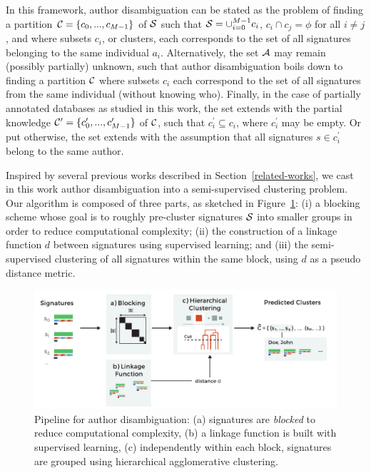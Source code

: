 \documentclass[conference]{IEEEtran}
\begin{document}
In this
framework, author disambiguation can be stated as the problem of
finding a partition ${\cal C} = \{ c_0, ..., c_{M-1} \}$ of ${\cal S}$ such
that ${\cal S} = \cup_{i=0}^{M-1} c_i$, $c_i \cap c_j = \phi$ for all $i \neq
j$, and where subsets $c_i$, or clusters, each corresponds to the set of all
signatures belonging to the same individual $a_i$. Alternatively, the set
${\cal A}$ may remain (possibly partially) unknown, such that author
disambiguation boils down to finding a partition ${\cal C}$ where
subsets $c_i$  each correspond to the set of all signatures from the same
individual (without knowing who). Finally, in the case of partially annotated databases as studied in
this work, the set extends with the partial knowledge ${\cal C}^\prime = \{ c_0^\prime, ..., c_{M-1}^\prime \}$ of ${\cal C}$,
such that $c_i^\prime \subseteq c_i$, where $c_i^\prime$ may be empty.
Or put otherwise, the set extends with the assumption that all signatures
$s \in c_i^\prime$ belong to the same author.

Inspired by several previous works described in Section~\ref{related-works},
we cast in this work author disambiguation into a semi-supervised clustering
problem.
Our algorithm is composed of three parts, as sketched in Figure~\ref{fig:workflow}: (i) a blocking
scheme whose goal is to roughly pre-cluster signatures ${\cal S}$ into smaller groups in order to
reduce computational complexity; (ii) the construction of a linkage function
$d$ between signatures using supervised learning; and (iii) the
semi-supervised clustering of all signatures within the same block, using $d$ as a pseudo distance metric.


\begin{figure}
\centering
\includegraphics[width=\linewidth]{fig-workflow}
\caption{Pipeline for author disambiguation: (a)
signatures are \textit{blocked} to reduce computational complexity, (b) a linkage
function is built with supervised learning, (c) independently within each block, signatures
are grouped using hierarchical agglomerative clustering.}
\label{fig:workflow}
\end{figure}
\end{document}
